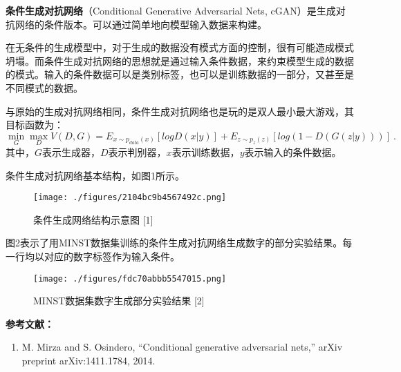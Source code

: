 

\textbf{条件生成对抗网络}（Conditional Generative Adversarial Nets, cGAN）是生成对抗网络的条件版本。可以通过简单地向模型输入数据来构建。

在无条件的生成模型中，对于生成的数据没有模式方面的控制，很有可能造成模式坍塌。而条件生成对抗网络的思想就是通过输入条件数据，来约束模型生成的数据的模式。输入的条件数据可以是类别标签，也可以是训练数据的一部分，又甚至是不同模式的数据。

与原始的生成对抗网络相同，条件生成对抗网络也是玩的是双人最小最大游戏，其目标函数为：
\begin{equation}
\mathop{\min}\limits_G \mathop {\max }\limits_D V(D,G)=E_{x\sim p_{data}(x)}[logD(x|y)]+E_{z\sim p_z(z)}[log(1-D(G(z|y)))]~.
\end{equation}
其中，$G$表示生成器，$D$表示判别器，$x$表示训练数据，$y$表示输入的条件数据。

条件生成对抗网络基本结构，如图1所示。
\begin{figure}[ht]
\centering
\texttt{[image: ./figures/2104bc9b4567492c.png]}
\caption{条件生成网络结构示意图 [1]} \label{fig_cGAN_1}
\end{figure}

图2表示了用MINST数据集训练的条件生成对抗网络生成数字的部分实验结果。每一行均以对应的数字标签作为输入条件。
\begin{figure}[ht]
\centering
\texttt{[image: ./figures/fdc70abbb5547015.png]}
\caption{MINST数据集数字生成部分实验结果 [2]} \label{fig_cGAN_2}
\end{figure}



\textbf{参考文献：}
\begin{enumerate}
\item M. Mirza and S. Osindero, “Conditional generative adversarial nets,” arXiv preprint arXiv:1411.1784, 2014.
\end{enumerate}
